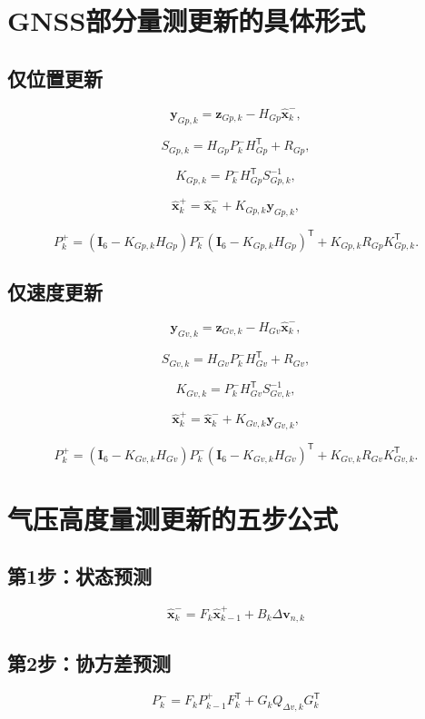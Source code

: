 \documentclass[12pt,a4paper]{ctexart}
\newcommand{\I}{\mathbf I}
\newcommand{\xhat}{\hat{\mathbf x}}
\newcommand{\transpose}{^{\mathsf T}}
\begin{document}
\section{GNSS部分量测更新的具体形式}

\subsection{仅位置更新}

\[
\mathbf y_{Gp,k}
=
\mathbf z_{Gp,k}
-
H_{Gp}\xhat_k^-,
\]

\[
S_{Gp,k}
=
H_{Gp}P_k^-H_{Gp}\transpose
+
R_{Gp},
\]

\[
K_{Gp,k}
=
P_k^-H_{Gp}\transpose S_{Gp,k}^{-1},
\]

\[
\xhat_k^+
=
\xhat_k^-
+
K_{Gp,k}\mathbf y_{Gp,k},
\]

\[
P_k^+
=
(\I_6-K_{Gp,k}H_{Gp})
P_k^-
(\I_6-K_{Gp,k}H_{Gp})\transpose
+
K_{Gp,k}R_{Gp}K_{Gp,k}\transpose.
\]

\subsection{仅速度更新}

\[
\mathbf y_{Gv,k}
=
\mathbf z_{Gv,k}
-
H_{Gv}\xhat_k^-,
\]

\[
S_{Gv,k}
=
H_{Gv}P_k^-H_{Gv}\transpose
+
R_{Gv},
\]

\[
K_{Gv,k}
=
P_k^-H_{Gv}\transpose S_{Gv,k}^{-1},
\]

\[
\xhat_k^+
=
\xhat_k^-
+
K_{Gv,k}\mathbf y_{Gv,k},
\]

\[
P_k^+
=
(\I_6-K_{Gv,k}H_{Gv})
P_k^-
(\I_6-K_{Gv,k}H_{Gv})\transpose
+
K_{Gv,k}R_{Gv}K_{Gv,k}\transpose.
\]

\section{气压高度量测更新的五步公式}

\subsection*{第1步：状态预测}

\[
\boxed{
\xhat_k^- =
F_k\xhat_{k-1}^+
+
B_k\Delta\mathbf v_{n,k}
}
\]

\subsection*{第2步：协方差预测}

\[
\boxed{
P_k^- =
F_kP_{k-1}^+F_k\transpose
+
G_kQ_{\Delta v,k}G_k\transpose
}
\]
\end{document}
